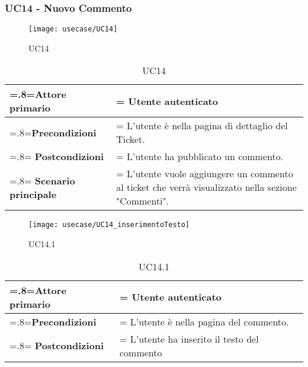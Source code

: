                 
  \subsubsection{UC14 - Nuovo Commento}               
   \begin{figure}[H]
    \centering 
    \texttt{[image: usecase/UC14]}
    \caption{UC14}
\end{figure}      
        
       \begin{table}[H]
                \centering
                \renewcommand{\arraystretch}{1.8}
                \renewcommand\tabularxcolumn[1]{m{#1}}
                \begin{tabularx}{0.9\textwidth} {
                    >{\hsize=.8\hsize\linewidth=\hsize}X
                    >{\hsize=1.2\hsize\linewidth=\hsize}X}
                    \hline
                    \textbf{Attore primario} & Utente autenticato \\
                    \hline
                    \textbf{Precondizioni} & L'utente è nella pagina di dettaglio del Ticket.\\
                    \hline
                    \textbf{Postcondizioni} & L'utente ha pubblicato un commento.\\
                    \hline
                    \textbf{Scenario principale} & L'utente vuole aggiungere un commento al ticket che verrà visualizzato nella sezione "Commenti". \\
                    \hline
                    
                \end{tabularx}
                \caption{UC14}
            \end{table}
            
\begin{figure}[H]
    \centering 
    \texttt{[image: usecase/UC14\_inserimentoTesto]}
    \caption{UC14.1}
\end{figure}    
        
       \begin{table}[H]
                \centering
                \renewcommand{\arraystretch}{1.8}
                \renewcommand\tabularxcolumn[1]{m{#1}}
                \begin{tabularx}{0.9\textwidth} {
                    >{\hsize=.8\hsize\linewidth=\hsize}X
                    >{\hsize=1.2\hsize\linewidth=\hsize}X}
                    \hline
                    \textbf{Attore primario} & Utente autenticato \\
                    \hline
                    \textbf{Precondizioni} & L'utente è nella pagina del commento.\\
                    \hline
                    \textbf{Postcondizioni} & L'utente ha inserito il testo del commento\\
                    \hline
                    
                \end{tabularx}
                \caption{UC14.1}
            \end{table}

